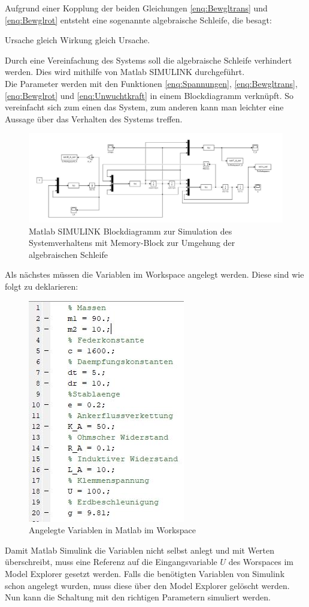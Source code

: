Aufgrund einer Kopplung der beiden Gleichungen \ref{enq:Bewgltrans} und \ref{enq:Bewglrot} entsteht eine sogenannte algebraische Schleife, die besagt:

\begin{center}
	Ursache gleich Wirkung gleich Ursache.
\end{center}

Durch eine Vereinfachung des Systems soll die algebraische Schleife verhindert werden. Dies wird mithilfe von Matlab SIMULINK durchgeführt. \\
Die Parameter werden mit den Funktionen \ref{enq:Spannungen}, \ref{enq:Bewgltrans}, \ref{enq:Bewglrot} und \ref{enq:Unwuchtkraft} in einem Blockdiagramm verknüpft. So vereinfacht sich zum einen das System, zum anderen kann man leichter eine Aussage über das Verhalten des Systems treffen.

\begin{figure}[hbt]
	\centering
	\includegraphics[width=1\linewidth]{Images/ProjektB_Elektrik_Blockdiagramm}
	\caption{Matlab SIMULINK Blockdiagramm zur Simulation des Systemverhaltens mit Memory-Block zur Umgehung der algebraischen Schleife}
	\label{fig:Blockdiagramm}
\end{figure}

Als nächstes müssen die Variablen im Workspace angelegt werden. Diese sind wie folgt zu deklarieren:

\begin{figure}[hbt]
	\centering
	\includegraphics[width=0.3\linewidth]{Images/Variablen}
	\caption{Angelegte Variablen in Matlab im Workspace}
	\label{fig:Variablen}
\end{figure}

Damit Matlab Simulink die Variablen nicht selbst anlegt und mit Werten überschreibt, muss eine Referenz auf die Eingangsvariable $U$ des Worspaces im Model Explorer gesetzt werden. Falls die benötigten Variablen von Simulink schon angelegt wurden, muss diese über den Model Explorer gelöscht werden. Nun kann die Schaltung mit den richtigen Parametern simuliert werden.